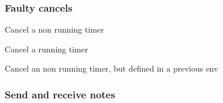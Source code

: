 \documentclass[a4paper]{article}
\begin{document}
\begin{pktxdiag}
 \testtimersi 
\end{pktxdiag}
\begin{pktxdiag}
 \testtimersir
\end{pktxdiag}

\subsubsection*{Faulty cancels}

Cancel a non running timer

\begin{pktxdiag}
\end{pktxdiag}
\begin{hpktxdiag}
\end{hpktxdiag}

Cancel a running timer

\begin{pktxdiag}
\end{pktxdiag}

Cancel an non running timer, but defined in a previous env

\begin{pktxdiag}
\end{pktxdiag}
\begin{hpktxdiag}
\end{hpktxdiag}


\def\testtimercancel{
  \AB[timed={2cm}{tada}]{yo}
  \Apause
}

\begin{pktxdiag}
  \testtimercancel
\end{pktxdiag}

\begin{hpktxdiag}
  \testtimercancel
\end{hpktxdiag}


\subsubsection*{Send and receive notes}

\begin{pktxdiag}
\end{pktxdiag}
\end{document}
